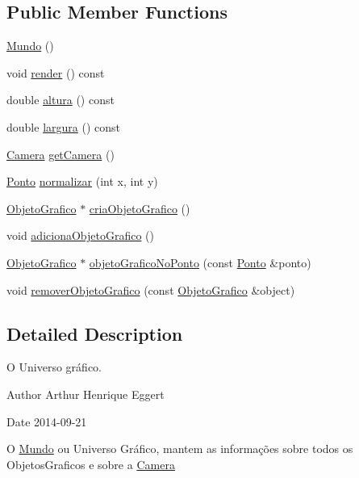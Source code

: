 \subsection*{Public Member Functions}
\begin{DoxyCompactItemize}
\item 
\hyperlink{classMundo_a425850071a4ead0edef44ffaa4e3d7d2}{Mundo} ()
\item 
void \hyperlink{classMundo_a1e5d427d26485ab7814cc559a3ae284d}{render} () const 
\item 
double \hyperlink{classMundo_a26788af3ad1edca991d40da2a6f2d577}{altura} () const 
\item 
double \hyperlink{classMundo_a384c4f3106d56abe23d08a6f267c076b}{largura} () const 
\item 
\hyperlink{classCamera}{Camera} \hyperlink{classMundo_ac89e4194871a994e169fb8dd32a191ed}{get\+Camera} ()
\item 
\hyperlink{classPonto}{Ponto} \hyperlink{classMundo_a20150531525b091d689b8f2fc1dd7cea}{normalizar} (int x, int y)
\item 
\hyperlink{classObjetoGrafico}{Objeto\+Grafico} $\ast$ \hyperlink{classMundo_a1d1dfa3384700b11fdbf34593f4e2115}{cria\+Objeto\+Grafico} ()
\item 
void \hyperlink{classMundo_aba8c427fe37a6b3ad82a95b726ce5a0c}{adiciona\+Objeto\+Grafico} ()
\item 
\hyperlink{classObjetoGrafico}{Objeto\+Grafico} $\ast$ \hyperlink{classMundo_a1c7df34ed7eee918781cdc956c199504}{objeto\+Grafico\+No\+Ponto} (const \hyperlink{classPonto}{Ponto} \&ponto)
\item 
void \hyperlink{classMundo_a63d93b69710062da89a50817952e77e4}{remover\+Objeto\+Grafico} (const \hyperlink{classObjetoGrafico}{Objeto\+Grafico} \&object)
\end{DoxyCompactItemize}


\subsection{Detailed Description}
O Universo gráfico. 

\begin{DoxyAuthor}{Author}
Arthur Henrique Eggert 
\end{DoxyAuthor}
\begin{DoxyDate}{Date}
2014-\/09-\/21
\end{DoxyDate}
O \hyperlink{classMundo}{Mundo} ou Universo Gráfico, mantem as informações sobre todos os Objetos\+Graficos e sobre a \hyperlink{classCamera}{Camera} 

